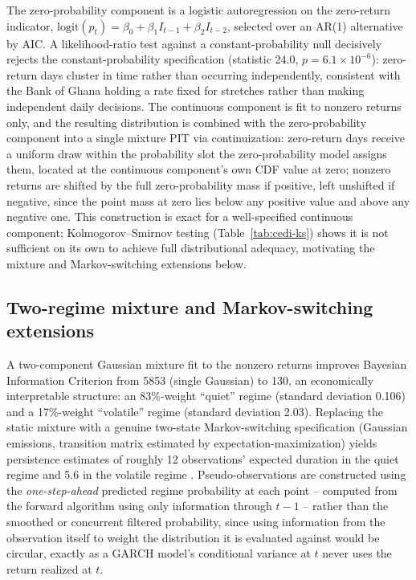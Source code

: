 \documentclass[final,3p,times,authoryear]{elsarticle}
\begin{document}
The zero-probability component is a logistic autoregression on the
zero-return indicator, $\mathrm{logit}(p_t) = \beta_0 + \beta_1
I_{t-1} + \beta_2 I_{t-2}$, selected over an AR(1) alternative by AIC.
A likelihood-ratio test against a constant-probability null decisively
rejects the constant-probability specification (statistic 24.0,
$p = 6.1\times 10^{-6}$): zero-return days cluster in time rather than
occurring independently, consistent with the Bank of Ghana holding a
rate fixed for stretches rather than making independent daily decisions.
The continuous component is fit to nonzero returns only, and the
resulting distribution is combined with the zero-probability component
into a single mixture PIT via continuization: zero-return days receive
a uniform draw within the probability slot the zero-probability model
assigns them, located at the continuous component's own CDF value at
zero; nonzero returns are shifted by the full zero-probability mass if
positive, left unshifted if negative, since the point mass at zero lies
below any positive value and above any negative one. This construction
is exact for a well-specified continuous component; Kolmogorov--Smirnov
testing (Table~\ref{tab:cedi-ks}) shows it is not sufficient on its own
to achieve full distributional adequacy, motivating the mixture and
Markov-switching extensions below.

\subsection{Two-regime mixture and Markov-switching extensions}

A two-component Gaussian mixture fit to the nonzero returns improves
Bayesian Information Criterion from 5853 (single Gaussian) to 130, an
economically interpretable structure: an 83\%-weight ``quiet'' regime
(standard deviation 0.106) and a 17\%-weight ``volatile'' regime
(standard deviation 2.03). Replacing the static mixture with a genuine
two-state Markov-switching specification (Gaussian emissions,
transition matrix estimated by expectation-maximization) yields
persistence estimates of roughly 12 observations' expected duration in
the quiet regime and 5.6 in the volatile regime \citep{hamilton1989}.
Pseudo-observations are constructed using the \emph{one-step-ahead}
predicted regime probability at each point -- computed from the forward
algorithm using only information through $t-1$ -- rather than the
smoothed or concurrent filtered probability, since using information
from the observation itself to weight the distribution it is evaluated
against would be circular, exactly as a GARCH model's conditional
variance at $t$ never uses the return realized at $t$.
\end{document}
